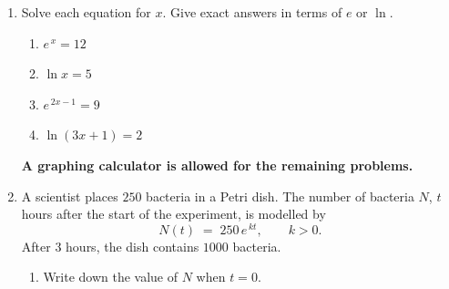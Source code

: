 \documentclass[12pt, twoside]{article}
\begin{document}
\begin{enumerate}[itemsep=0.4cm]
\begin{enumerate}[label=(\alph*), itemsep=0.6cm]
  \item $\ln\!\left(e^{\,4}\right)$
  \vspace{0.9cm}

  \item $e^{\,\ln 7}$
  \vspace{0.9cm}

  \item $\ln\!\left(e^{\,2x+1}\right)$
  \vspace{0.9cm}

  \item $e^{\,3\ln 2}$
  \vspace{0.9cm}
\end{enumerate}

\item[3.] Solve each equation for $x$. Give exact answers in terms of $e$ or $\ln$.

\begin{enumerate}[label=(\alph*), itemsep=0.6cm]
  \item $e^{\,x} = 12$
  \vspace{0.9cm}

  \item $\ln x = 5$
  \vspace{0.9cm}

  \item $e^{\,2x-1} = 9$
  \vspace{0.9cm}

  \item $\ln(3x + 1) = 2$
  \vspace{0.9cm}
\end{enumerate}

\newpage

\begin{center}
\textbf{A graphing calculator is allowed for the remaining problems.}
\end{center}
\vspace{0.2cm}

\item[4.] A scientist places $250$ bacteria in a Petri dish. The number of
bacteria $N$, $t$ hours after the start of the experiment, is modelled by
$$N(t) \;=\; 250\, e^{\,k t}, \qquad k > 0.$$
After $3$ hours, the dish contains $1000$ bacteria.

\begin{enumerate}[label=(\alph*), itemsep=0.3cm]
  \item Write down the value of $N$ when $t = 0$.


\end{enumerate}
\end{enumerate}
\end{document}
